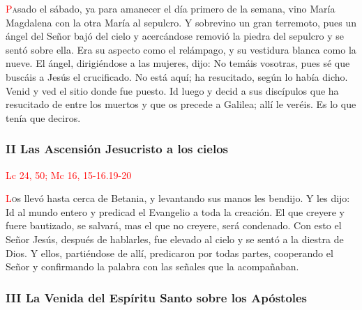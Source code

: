 \documentclass[10pt,twoside]{book}
\begin{document}
\lettrine[lines=2]{\textcolor{red}{P}}asado el sábado, ya para amanecer el día primero de la semana, vino María Magdalena con la otra María al sepulcro. Y sobrevino un gran terremoto,
pues un ángel del Señor bajó del cielo y acercándose removió la piedra del sepulcro y se sentó sobre ella. Era su aspecto como el relámpago, y su vestidura blanca como la nueve.
El ángel, dirigiéndose a las mujeres, dijo: No temáis vosotras, pues sé que buscáis a Jesús el crucificado. No está aquí; ha resucitado, según lo había dicho.
Venid y ved el sitio donde fue puesto. Id luego y decid a sus discípulos que ha resucitado de entre los muertos y que os precede a Galilea; allí le veréis.
Es lo que tenía que deciros.

\vspace{0.5em}



\vspace{1.5em}

\noindent\subsubsection*{II Las Ascensión Jesucristo a los cielos}

\vspace{-0.5em}

\hfill\textcolor{red}{Lc 24, 50; Mc 16, 15-16.19-20}

\lettrine[lines=2]{\textcolor{red}{L}}os llevó hasta cerca de Betania, y levantando sus manos les bendijo. Y les dijo: Id al mundo entero y predicad el Evangelio a toda la creación.
El que creyere y fuere bautizado, se salvará, mas el que no creyere, será condenado. Con esto el Señor Jesús, después de hablarles, fue elevado al cielo y se sentó a la diestra de Dios.
Y ellos, partiéndose de allí, predicaron por todas partes, cooperando el Señor y confirmando la palabra con las señales que la acompañaban.

\vspace{0.5em}



\vspace{1.5em}

\noindent\subsubsection*{III La Venida del Espíritu Santo sobre los Apóstoles}

\vspace{-0.5em}
\end{document}
